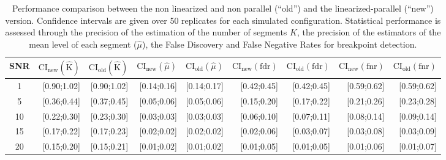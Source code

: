 \documentclass[11pt]{llncs}
\begin{document}
\begin{table}[ht]
\begin{center}
\begin{small}
\begin{tabular}{|c|rr|rr|rr|rr|}
  \hline
SNR  &  $\text{CI}_{\text{new}}(\widehat{\text{K}})$ & $\text{CI}_{\text{old}}(\widehat{\text{K}})$ & $ \text{CI}_{\text{new}}(\hat{\mu})$ & $\text{CI}_{\text{old}}(\hat{\mu})$ & $\text{CI}_{\text{new}}(\text{fdr})$ & $\text{CI}_{\text{old}}(\text{fdr})$   
     & $\text{CI}_{\text{new}}(\text{fnr})$ & $\text{CI}_{\text{old}}(\text{fnr})$  \\
  \hline
  1   & [0.90;1.02] & [0.90;1.02] & [0.14;0.16] & [0.14;0.17] & [0.42;0.45] & [0.42;0.45] & [0.59;0.62] & [0.59;0.62] \\ 
  5   & [0.36;0.44] & [0.37;0.45] & [0.05;0.06] & [0.05;0.06] & [0.15;0.20] & [0.17;0.22] & [0.21;0.26] & [0.23;0.28] \\ 
  10  & [0.22;0.30] & [0.23;0.30] & [0.03;0.03] & [0.03;0.03] & [0.06;0.10] & [0.07;0.11] & [0.08;0.14] & [0.09;0.14] \\ 
  15  & [0.17;0.22] & [0.17;0.23] & [0.02;0.02] & [0.02;0.02] & [0.02;0.06] & [0.03;0.07] & [0.03;0.08] & [0.03;0.09] \\ 
  20  & [0.15;0.20] & [0.15;0.21] & [0.01;0.02] & [0.01;0.02] & [0.01;0.05] & [0.01;0.05] & [0.01;0.06] & [0.01;0.07] \\ 
   \hline
\end{tabular}
\end{small}
\end{center}
\caption{Performance comparison between the non linearized and non parallel (``old'') and the linearized-parallel (``new'') version. Confidence intervals are given over 50 replicates for each simulated configuration. Statistical performance is assessed through the precision of the estimation of the number of segments $\hat{K}$, the precision of the estimators of the mean level of each segment ($\hat{\mu}$), the False Discovery and False Negative Rates for breakpoint detection.} 
\end{table}
\end{document}
